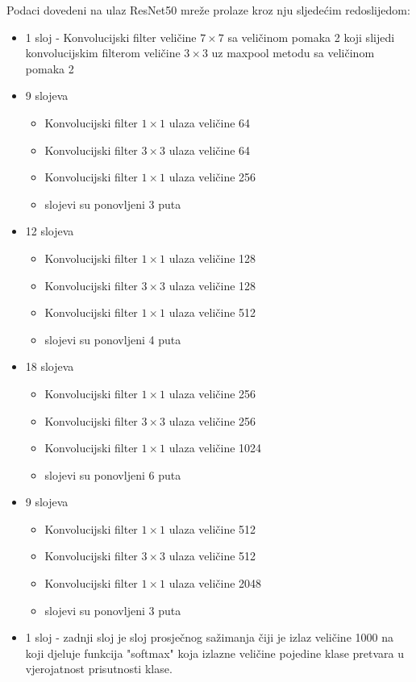 \documentclass[times, utf8, zavrsni,numeric,pstricks]{fer}
\begin{document}
Podaci dovedeni na ulaz ResNet50 mreže prolaze kroz nju sljedećim redoslijedom:
\begin{itemize}
	\item 1 sloj - Konvolucijski filter veličine $7\times7$ sa veličinom pomaka 2 koji slijedi konvolucijskim filterom veličine $3\times3$ uz maxpool metodu sa veličinom pomaka 2
	
	\item 9 slojeva
		\begin{itemize}
			\item Konvolucijski filter $1\times1$ ulaza veličine 64
			\item Konvolucijski filter $3\times3$ ulaza veličine 64
			\item Konvolucijski filter $1\times1$ ulaza veličine 256
			\item slojevi su ponovljeni 3 puta
		\end{itemize}
		
	\item 12 slojeva
		\begin{itemize}
			\item Konvolucijski filter $1\times1$ ulaza veličine 128
			\item Konvolucijski filter $3\times3$ ulaza veličine 128
			\item Konvolucijski filter $1\times1$ ulaza veličine 512
			\item slojevi su ponovljeni 4 puta
		\end{itemize}
		
	\item 18 slojeva
		\begin{itemize}
			\item Konvolucijski filter $1\times1$ ulaza veličine 256
			\item Konvolucijski filter $3\times3$ ulaza veličine 256
			\item Konvolucijski filter $1\times1$ ulaza veličine 1024
			\item slojevi su ponovljeni 6 puta
		\end{itemize}
		
	\item 9 slojeva
		\begin{itemize}
			\item Konvolucijski filter $1\times1$ ulaza veličine 512
			\item Konvolucijski filter $3\times3$ ulaza veličine 512
			\item Konvolucijski filter $1\times1$ ulaza veličine 2048
			\item slojevi su ponovljeni 3 puta
		\end{itemize}
		
		
\item 1 sloj - zadnji sloj je sloj prosječnog sažimanja čiji je izlaz veličine 1000 na koji djeluje funkcija "softmax" koja izlazne veličine pojedine klase pretvara u vjerojatnost prisutnosti klase. 
\end{itemize}
\end{document}
